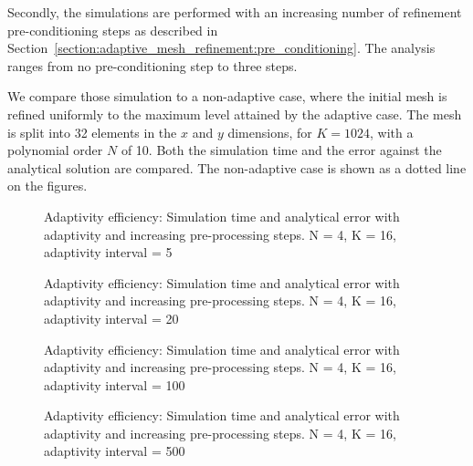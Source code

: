 Secondly, the simulations are performed with an increasing number of refinement pre-conditioning
steps as described in Section~\ref{section:adaptive_mesh_refinement:pre_conditioning}. The analysis
ranges from no pre-conditioning step to three steps.

We compare those simulation to a non-adaptive case, where the initial mesh is refined uniformly to
the maximum level attained by the adaptive case. The mesh is split into 32 elements in the \(x\) and
\(y\) dimensions, for  \(K = 1024\), with a polynomial order  \(N\) of 10. Both the simulation time
and the error against the analytical solution are compared. The non-adaptive case is shown as a
dotted line on the figures.

\begin{figure}[H]
	\centering
	\caption{Adaptivity efficiency: Simulation time and analytical error with adaptivity and increasing pre-processing steps. N = 4, K = 16, adaptivity interval = 5}\label{fig:adaptivity_efficiency_C5}
\end{figure}

\begin{figure}[H]
	\centering
	\hfill
	\caption{Adaptivity efficiency: Simulation time and analytical error with adaptivity and increasing pre-processing steps. N = 4, K = 16, adaptivity interval = 20}\label{fig:adaptivity_efficiency_C20}
\end{figure}

\begin{figure}[H]
	\centering
	\hfill
	\caption{Adaptivity efficiency: Simulation time and analytical error with adaptivity and increasing pre-processing steps. N = 4, K = 16, adaptivity interval = 100}\label{fig:adaptivity_efficiency_C100}
\end{figure}

\begin{figure}[H]
	\centering
	\hfill
	\caption{Adaptivity efficiency: Simulation time and analytical error with adaptivity and increasing pre-processing steps. N = 4, K = 16, adaptivity interval = 500}\label{fig:adaptivity_efficiency_C500}
\end{figure}

